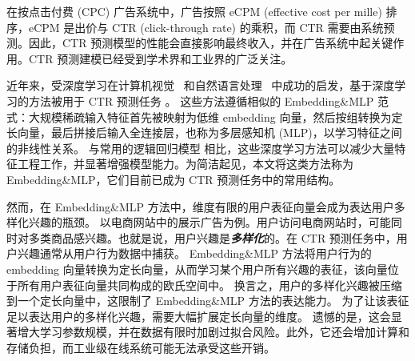 在按点击付费 (CPC) 广告系统中，广告按照 eCPM (effective cost per mille) 排序，eCPM 是出价与 CTR (click-through rate) 的乘积，而 CTR 需要由系统预测。因此，CTR 预测模型的性能会直接影响最终收入，并在广告系统中起关键作用。CTR 预测建模已经受到学术界和工业界的广泛关注。

近年来，受深度学习在计算机视觉~\cite{huang2016densely} 和自然语言处理~\cite{bengio:attention} 中成功的启发，基于深度学习的方法被用于 CTR 预测任务 \cite{deep_crossing,youtube:recommend,deep_intent,widedeep}。
这些方法遵循相似的 Embedding\&MLP 范式：大规模稀疏输入特征首先被映射为低维 embedding 向量，然后按组转换为定长向量，最后拼接后输入全连接层，也称为多层感知机 (MLP)，以学习特征之间的非线性关系。
与常用的逻辑回归模型 \cite{ftrl} 相比，这些深度学习方法可以减少大量特征工程工作，并显著增强模型能力。为简洁起见，本文将这类方法称为 Embedding\&MLP，它们目前已成为 CTR 预测任务中的常用结构。

然而，在 Embedding\&MLP 方法中，维度有限的用户表征向量会成为表达用户多样化兴趣的瓶颈。%
以电商网站中的展示广告为例。用户访问电商网站时，可能同时对多类商品感兴趣。也就是说，用户兴趣是\textsl{\textbf{多样化}}的。在 CTR 预测任务中，用户兴趣通常从用户行为数据中捕获。
Embedding\&MLP 方法将用户行为的 embedding 向量转换为定长向量，从而学习某个用户所有兴趣的表征，该向量位于所有用户表征向量共同构成的欧氏空间中。
换言之，用户的多样化兴趣被压缩到一个定长向量中，这限制了 Embedding\&MLP 方法的表达能力。
为了让该表征足以表达用户的多样化兴趣，需要大幅扩展定长向量的维度。
遗憾的是，这会显著增大学习参数规模，并在数据有限时加剧过拟合风险。此外，它还会增加计算和存储负担，而工业级在线系统可能无法承受这些开销。

